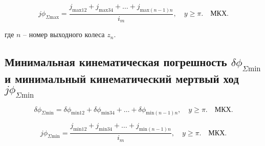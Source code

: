\begin{equation}
    j\phi_{\Sigma \text{max}} = \frac{j_{\text{max}12} + j_{\text{max}34} + \dots + j_{\text{max}(n-1)n}}{i_m}, \quad y \geq \pi. \quad \text{МКХ.} \tag{6.54}
\end{equation}

где $n$ -- номер выходного колеса $z_n$.

\subsection*{Минимальная кинематическая погрешность $\delta\phi_{\Sigma \text{min}}$ и минимальный кинематический мертвый ход $j\phi_{\Sigma \text{min}}$}

\begin{equation}
    \delta\phi_{\Sigma \text{min}} = \delta\phi_{\text{min}12} + \delta\phi_{\text{min}34} + \dots + \delta\phi_{\text{min}(n-1)n}, \quad y \geq \pi. \quad \text{МКХ.} \tag{6.55}
\end{equation}

\begin{equation}
    j\phi_{\Sigma \text{min}} = \frac{j_{\text{min}12} + j_{\text{min}34} + \dots + j_{\text{min}(n-1)n}}{i_m}, \quad y \geq \pi. \quad \text{МКХ.} \tag{6.56}
\end{equation}

